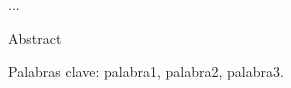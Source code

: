 \documentclass[
	spanish, %
	letterpaper, oneside, openany
]{book}
\let\originalListOfFigures\listoffigures
\renewcommand{\listoffigures}{%
    \clearpage
    \phantomsection
    \addcontentsline{toc}{chapter}{Índice de Ilustraciones}
    \originalListOfFigures
}
\begin{document}
\templatePortrait

\templatePagecfg




\begin{resumend}
...
\end{resumend}

\begin{abstractd}

Abstract

\mbox{}

Palabras clave: palabra1, palabra2, palabra3.

\end{abstractd}



\clearpage
\thispagestyle{plain}
\null
\newpage



\templateIndex




\clearpage
{}
{}
\renewcommand{\listtablename}{\namelttable}
\listoftables
\end{document}
